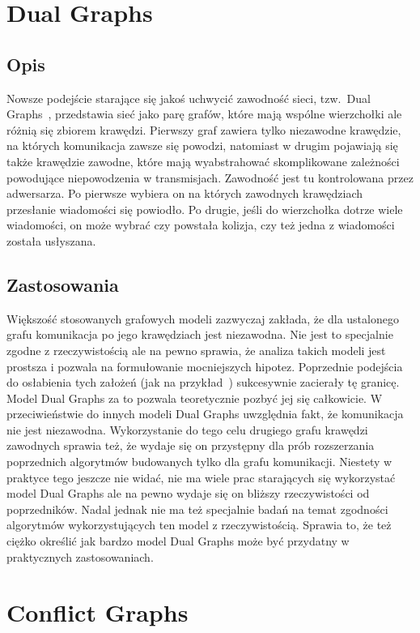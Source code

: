 \documentclass[11pt,a4paper,onecolumn,twoside]{mwart}
\begin{document}
\section{Dual Graphs}
\subsection{Opis}
Nowsze podejście starające się jakoś uchwycić zawodność sieci, tzw.\ Dual
Graphs~\cite{Kuhn:2010:BUR:1835698.1835779}, przedstawia sieć jako parę grafów,
które mają wspólne wierzchołki ale różnią się zbiorem krawędzi. Pierwszy graf
zawiera tylko niezawodne krawędzie, na których komunikacja zawsze się powodzi,
natomiast w drugim pojawiają się także krawędzie zawodne, które mają
wyabstrahować skomplikowane zależności powodujące niepowodzenia w transmisjach.
Zawodność jest tu kontrolowana przez adwersarza. Po pierwsze wybiera on na
których zawodnych krawędziach przesłanie wiadomości się powiodło. Po drugie,
jeśli do wierzchołka dotrze wiele wiadomości, on może wybrać czy powstała
kolizja, czy też jedna z wiadomości została usłyszana.

\subsection{Zastosowania}
Większość stosowanych grafowych modeli zazwyczaj zakłada, że dla ustalonego
grafu komunikacja po jego krawędziach jest niezawodna. Nie jest to specjalnie
zgodne z rzeczywistością ale na pewno sprawia, że analiza takich modeli jest
prostsza i pozwala na formułowanie mocniejszych hipotez. Poprzednie podejścia
do osłabienia tych założeń (jak na przykład~\cite{Kuhn:2003:ANB:941079.941089})
sukcesywnie zacierały tę granicę. Model Dual Graphs za to pozwala teoretycznie
pozbyć jej się całkowicie. W przeciwieństwie do innych modeli Dual Graphs
uwzględnia fakt, że komunikacja nie jest niezawodna. Wykorzystanie do tego celu
drugiego grafu krawędzi zawodnych sprawia też, że wydaje się on przystępny dla
prób rozszerzania poprzednich algorytmów budowanych tylko dla grafu komunikacji.
Niestety w praktyce tego jeszcze nie widać, nie ma wiele prac starających się
wykorzystać model Dual Graphs ale na pewno wydaje się on bliższy rzeczywistości
od poprzedników. Nadal jednak nie ma też specjalnie badań na temat zgodności
algorytmów wykorzystujących ten model z rzeczywistością. Sprawia to, że też
ciężko określić jak bardzo model Dual Graphs może być przydatny w praktycznych
zastosowaniach.

\section{Conflict Graphs}
\end{document}
